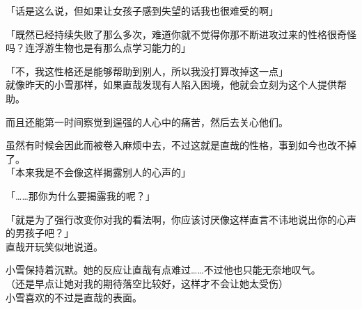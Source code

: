 「话是这么说，但如果让女孩子感到失望的话我也很难受的啊」

「既然已经持续失败了那么多次，难道你就不觉得你那不断进攻过来的性格很奇怪吗？连浮游生物也是有那么点学习能力的」

「不，我这性格还是能够帮助到别人，所以我没打算改掉这一点」\\

就像昨天的小雪那样，如果直哉发现有人陷入困境，他就会立刻为这个人提供帮助。

而且还能第一时间察觉到逞强的人心中的痛苦，然后去关心他们。

虽然有时候会因此而被卷入麻烦中去，不过这就是直哉的性格，事到如今也改不掉了。\\

「本来我是不会像这样揭露别人的心声的」

「……那你为什么要揭露我的呢？」

「就是为了强行改变你对我的看法啊，你应该讨厌像这样直言不讳地说出你的心声的男孩子吧？」\\

直哉开玩笑似地说道。

小雪保持着沉默。她的反应让直哉有点难过……不过他也只能无奈地叹气。\\

（还是早点让她对我的期待落空比较好，这样才不会让她太受伤）\\

小雪喜欢的不过是直哉的表面。

